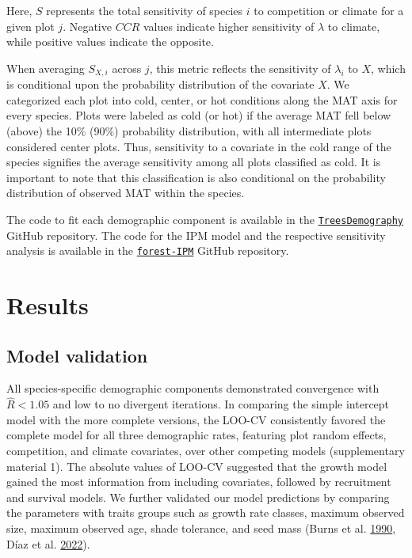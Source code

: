 \documentclass[12pt]{article}
\begin{document}
Here, \(S\) represents the total sensitivity of species \(i\) to
competition or climate for a given plot \(j\). Negative \(CCR\) values
indicate higher sensitivity of \(\lambda\) to climate, while positive
values indicate the opposite.

When averaging \(S_{X,i}\) across \(j\), this metric reflects the
sensitivity of \(\lambda_i\) to \(X\), which is conditional upon the
probability distribution of the covariate \(X\). We categorized each
plot into cold, center, or hot conditions along the MAT axis for every
species. Plots were labeled as cold (or hot) if the average MAT fell
below (above) the 10\% (90\%) probability distribution, with all
intermediate plots considered center plots. Thus, sensitivity to a
covariate in the cold range of the species signifies the average
sensitivity among all plots classified as cold. It is important to note
that this classification is also conditional on the probability
distribution of observed MAT within the species.

The code to fit each demographic component is available in the
\href{https://github.com/willvieira/TreesDemography}{\texttt{TreesDemography}}
GitHub repository. The code for the IPM model and the respective
sensitivity analysis is available in the
\href{https://github.com/willvieira/forest-IPM/tree/master/simulations/covariates_perturbation}{\texttt{forest-IPM}}
GitHub repository.

\hypertarget{results}{%
\section{Results}\label{results}}

\hypertarget{model-validation}{%
\subsection{Model validation}\label{model-validation}}

All species-specific demographic components demonstrated convergence
with \(\hat{R} <1.05\) and low to no divergent iterations. In comparing
the simple intercept model with the more complete versions, the LOO-CV
consistently favored the complete model for all three demographic rates,
featuring plot random effects, competition, and climate covariates, over
other competing models (supplementary material 1). The absolute values
of LOO-CV suggested that the growth model gained the most information
from including covariates, followed by recruitment and survival models.
We further validated our model predictions by comparing the parameters
with traits groups such as growth rate classes, maximum observed size,
maximum observed age, shade tolerance, and seed mass (Burns et al.
\protect\hyperlink{ref-burns1990silvics}{1990}, Díaz et al.
\protect\hyperlink{ref-diaz2022}{2022}).
\end{document}
